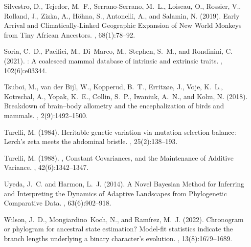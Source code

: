 \documentclass{article}
\begin{document}
\begin{thebibliography}{}
Silvestro, D., Tejedor, M.~F., {Serrano-Serrano}, M.~L., Loiseau, O., Rossier,
  V., Rolland, J., Zizka, A., H{\"o}hna, S., Antonelli, A., and Salamin, N.
  (2019).
\newblock Early {{Arrival}} and {{Climatically-Linked Geographic Expansion}} of
  {{New World Monkeys}} from {{Tiny African Ancestors}}.
, 68(1):78--92.

Soria, C.~D., Pacifici, M., Di~Marco, M., Stephen, S.~M., and Rondinini, C.
  (2021).
: A coalesced mammal database of intrinsic and extrinsic
  traits.
, 102(6):e03344.

Tsuboi, M., {van der Bijl}, W., Kopperud, B.~T., Erritz{\o}e, J., Voje, K.~L.,
  Kotrschal, A., Yopak, K.~E., Collin, S.~P., Iwaniuk, A.~N., and Kolm, N.
  (2018).
\newblock Breakdown of brain--body allometry and the encephalization of birds
  and mammals.
, 2(9):1492--1500.

Turelli, M. (1984).
\newblock Heritable genetic variation via mutation-selection balance:
  {{Lerch}}'s zeta meets the abdominal bristle.
, 25(2):138--193.

Turelli, M. (1988).
, {{Constant Covariances}}, {{and the
  Maintenance of Additive Variance}}.
, 42(6):1342--1347.

Uyeda, J.~C. and Harmon, L.~J. (2014).
\newblock A {{Novel Bayesian Method}} for {{Inferring}} and {{Interpreting}}
  the {{Dynamics}} of {{Adaptive Landscapes}} from {{Phylogenetic Comparative
  Data}}.
, 63(6):902--918.

Wilson, J.~D., Mongiardino~Koch, N., and Ram{\'i}rez, M.~J. (2022).
\newblock Chronogram or phylogram for ancestral state estimation? {{Model-fit}}
  statistics indicate the branch lengths underlying a binary character's
  evolution.
, 13(8):1679--1689.

\end{thebibliography}


\end{document}
